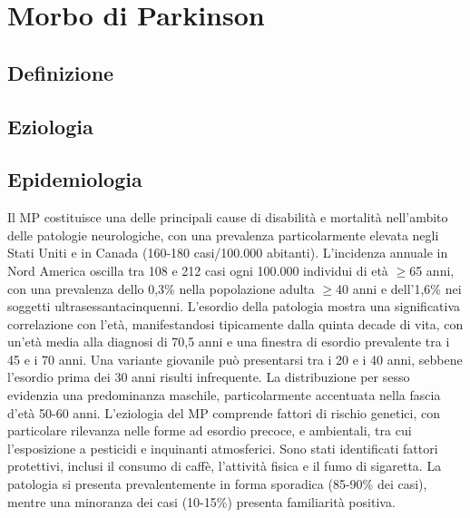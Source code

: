 \section{Morbo di Parkinson}

\subsection{Definizione}

\subsection{Eziologia}

\subsection{Epidemiologia}
Il MP costituisce una delle principali cause di disabilità e mortalità nell'ambito delle patologie neurologiche, con una prevalenza particolarmente elevata negli Stati Uniti e in Canada (160-180 casi/100.000 abitanti). L'incidenza annuale in Nord America oscilla tra 108 e 212 casi ogni 100.000 individui di età $\geq$65 anni, con una prevalenza dello 0,3\% nella popolazione adulta $\geq$40 anni e dell'1,6\% nei soggetti ultrasessantacinquenni.
L'esordio della patologia mostra una significativa correlazione con l'età, manifestandosi tipicamente dalla quinta decade di vita, con un'età media alla diagnosi di 70,5 anni e una finestra di esordio prevalente tra i 45 e i 70 anni. Una variante giovanile può presentarsi tra i 20 e i 40 anni, sebbene l'esordio prima dei 30 anni risulti infrequente. La distribuzione per sesso evidenzia una predominanza maschile, particolarmente accentuata nella fascia d'età 50-60 anni.
L'eziologia del MP comprende fattori di rischio genetici, con particolare rilevanza nelle forme ad esordio precoce, e ambientali, tra cui l'esposizione a pesticidi e inquinanti atmosferici. Sono stati identificati fattori protettivi, inclusi il consumo di caffè, l'attività fisica e il fumo di sigaretta. La patologia si presenta prevalentemente in forma sporadica (85-90\% dei casi), mentre una minoranza dei casi (10-15\%) presenta familiarità positiva.


